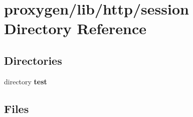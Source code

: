 \section{proxygen/lib/http/session Directory Reference}
\label{dir_91354efb629f2a2f97c22c183d400178}
\subsection*{Directories}
\begin{DoxyCompactItemize}
\item 
directory {\bf test}
\end{DoxyCompactItemize}
\subsection*{Files}
